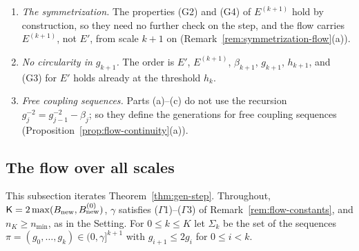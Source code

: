 \begin{remark}\label{rem:gen-step}
\begin{enumerate}[label=(\alph*)]
\item \emph{The symmetrization.} The properties (G2) and (G4) of $E^{(k+1)}$ hold by construction, so they need no further check on the step, and the flow carries $E^{(k+1)}$, not $E'$, from scale $k+1$ on (Remark~\ref{rem:symmetrization-flow}(a)).
\item \emph{No circularity in $g_{k+1}$.} The order is $E'$, $E^{(k+1)}$, $\beta_{k+1}$, $g_{k+1}$, $h_{k+1}$, and (G3) for $E'$ holds already at the threshold $h_k$.
\item \emph{Free coupling sequences.} Parts (a)--(c) do not use the recursion $g_j^{-2}=g_{j-1}^{-2}-\beta_j$; so they define the generations for free coupling sequences (Proposition~\ref{prop:flow-continuity}(a)).
\end{enumerate}
\end{remark}

\subsection{The flow over all scales}\label{subsec:flow4-flow}

This subsection iterates Theorem~\ref{thm:gen-step}. Throughout, $\mathsf K=2\max(B_{\rm new},B^{(0)}_{\rm new})$, $\gamma$ satisfies ($\Gamma$1)--($\Gamma$3) of Remark~\ref{rem:flow-constants}, and $n_K\ge n_{\min}$, as in the Setting. For $0\le k\le K$ let $\Sigma_k$ be the set of the sequences $\pi=(g_0,\dots,g_k)\in(0,\gamma]^{k+1}$ with $g_{i+1}\le2g_i$ for $0\le i<k$.

